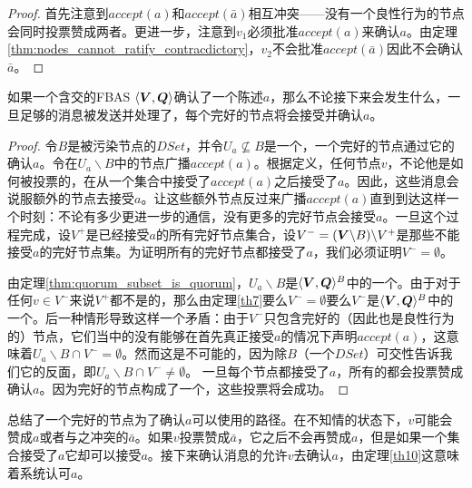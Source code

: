 \begin{proof}
	首先注意到$accept(a)$和$accept(\bar a)$相互冲突——没有一个良性行为的节点会同时投票赞成两者。更进一步，注意到$v_1$必须批准$accept(a)$来确认$a$。由定理\ref{thm:nodes_cannot_ratify_contracdictory}，$v_2$不会批准$accept(\bar a)$因此不会确认$\bar a$。
\end{proof}

\begin{theorem}\label{th10}
	如果一个含{\quorum}交的FBAS $\langle{\bm V},{\bm Q}\rangle$确认了一个陈述$a$，那么不论接下来会发生什么，一旦足够的消息被发送并处理了，每个完好的节点将会接受并确认$a$。
\end{theorem}

\begin{proof}
	令$B$是被污染节点的$DSet$，并令$U_a\not \subseteq B$是一个{\quorum}，一个完好的节点通过它的确认$a$。令在$U_a\backslash B$中的节点广播$accept(a)$。根据定义，任何节点$v$，不论他是如何被投票的，在从一个{\vblock}集合中接受了$accept(a)$之后接受了$a$。因此，这些消息会说服额外的节点去接受$a$。让这些额外节点反过来广播$accept(a)$直到到达这样一个时刻：不论有多少更进一步的通信，没有更多的完好节点会接受$a$。一旦这个过程完成，设$V^+$是已经接受$a$的所有完好节点集合，设$V^-=({\bm V}\backslash B)\backslash V^+$是那些不能接受$a$的完好节点集。为证明所有的完好节点都接受了$a$，我们必须证明$V^-=\emptyset$。

	由定理\ref{thm:quorum_subset_is_quorum}，$U_a\backslash B$是$\langle{\bm V},{\bm Q}\rangle^{B}$中的一个{\quorum}。由于对于任何$v\in V^-$来说$V^+$都不是{\vblock}的，那么由定理\ref{th7}要么$V^-=\emptyset$要么$V^-$是$\langle{\bm V},{\bm Q}\rangle^{B}$中的一个{\quorum}。后一种情形导致这样一个矛盾：由于$V^-$只包含完好的（因此也是良性行为的）节点，它们当中的没有能够在首先真正接受$a$的情况下声明$accept(a)$，这意味着$U_a\backslash B\cap V^-=\emptyset$。然而这是不可能的，因为除$B$（一个$DSet$）{\quorum}可交性告诉我们它的反面，即$U_a\backslash B\cap V^-\neq\emptyset$。	一旦每个节点都接受了$a$，所有的都会投票赞成确认$a$。因为完好的节点构成了一个{\quorum}，这些投票将会成功。
\end{proof}

总结了一个完好的节点为了确认$a$可以使用的路径。在不知情的状态下，$v$可能会赞成$a$或者与之冲突的$\bar a$。如果$v$投票赞成$\bar a$，它之后不会再赞成$a$，但是如果一个{\vblock}集合接受了$a$它却可以接受$a$。接下来确认消息的{\quorum}允许$v$去确认$a$，由定理\ref{th10}这意味着系统认可$a$。